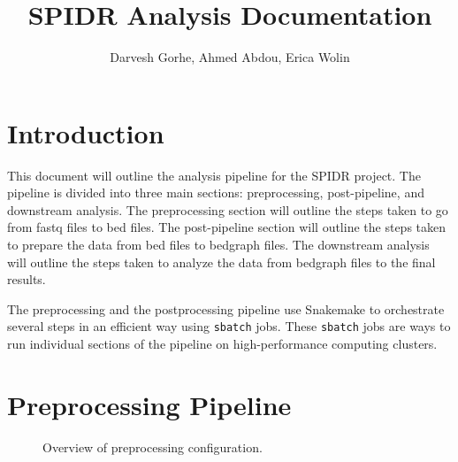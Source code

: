 \documentclass{article}
\title{SPIDR Analysis Documentation}
\author{Darvesh Gorhe, Ahmed Abdou, Erica Wolin}
\begin{document}
    \maketitle
    \tableofcontents

    \section{Introduction}
    This document will outline the analysis pipeline for the SPIDR project. The pipeline is divided into three main sections: preprocessing, post-pipeline, and downstream analysis. The preprocessing section will outline the steps taken to go from fastq files to bed files. The post-pipeline section will outline the steps taken to prepare the data from bed files to bedgraph files. The downstream analysis will outline the steps taken to analyze the data from bedgraph files to the final results.
    \vspace{5mm}

    \noindent The preprocessing and the postprocessing pipeline use Snakemake to orchestrate several steps in an efficient way using \texttt{sbatch} jobs. These \texttt{sbatch} jobs are ways to run individual sections of the pipeline on high-performance computing clusters.

    \section{Preprocessing Pipeline}

    \begin{figure}[ht!]
        \centering
        \caption[short]{Overview of preprocessing configuration.}
    \end{figure}
\end{document}
